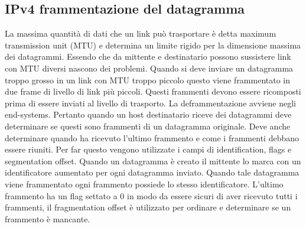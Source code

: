 \subsection{IPv4 frammentazione del datagramma}
La massima quantit\`a di dati che un link pu\`o trasportare \`e detta maximum transmission unit (MTU) e determina un limite rigido per la dimensione massima
dei datagrammi. Essendo che da mittente e destinatario possono sussistere link con MTU diversi nascono dei problemi. Quando si deve inviare un datagramma
troppo grosso in un link con MTU troppo piccolo questo viene frammentato in due frame di livello di link pi\`u piccoli. Questi frammenti devono essere 
ricomposti prima di essere inviati al livello di trasporto. La deframmentazione avviene negli end-systems. Pertanto quando un host destinatario riceve dei
datagrammi deve determinare se questi sono frammenti di un datagramma originale. Deve anche determinare quando ha ricevuto l'ultimo frammento e come i 
frammenti debbano essere riuniti. Per far questo vengono utilizzate i campi di identification, flags e segmentation offset. Quando un datagramma \`e creato
il mittente lo marca con un identificatore  aumentato per ogni datagramma inviato. Quando tale datagramma viene frammentato ogni frammento possiede lo 
stesso identificatore. L'ultimo frammento ha un flag settato a 0 in modo da essere sicuri di aver ricevuto tutti i frammenti, il fragmentation offset \`e
utilizzato per ordinare e determinare se un frammento \`e mancante. 
